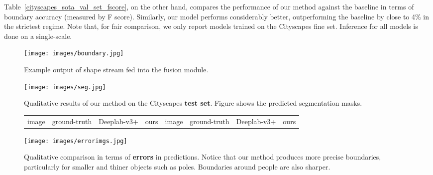 \documentclass[10pt,twocolumn,letterpaper]{article}
\begin{document}
Table~\ref{cityscapes_sota_val_set_fscore}, on the other hand, compares the performance of our method against the baseline in terms of boundary accuracy (measured by F score). 
Similarly, our model performs considerably better, outperforming the baseline by close to 4\% in the strictest regime. 
Note that, for fair comparison, we only report models trained on the Cityscapes fine set. Inference for all models is done on a single-scale.
  
  
  \begin{figure}[t!]
\vspace{-2mm}
\centering
\texttt{[image: images/boundary.jpg]}
\vspace{-7mm}
\caption{Example output of shape stream fed into the fusion module.
}
\label{fig:boundary}
\vspace{-2mm}
\end{figure}

\begin{figure*}[t!]
 
\centering
\texttt{[image: images/seg.jpg]} 
\vspace{-6.5mm}
\caption{Qualitative results of our method on the Cityscapes {\bf test set}. Figure shows the predicted segmentation masks.}
\label{fig:testset}
\end{figure*}

\begin{figure*}[t!]
  \vspace{-1mm}
 \centering
 \begin{footnotesize}
 \begin{tabular}{C{1.6cm}C{1.7cm}C{1.7cm}C{1.8cm}C{2cm}C{1.7cm}C{1.7cm}C{1.7cm}}
 image & ground-truth & Deeplab-v3+ & ours &  image & ground-truth & Deeplab-v3+ & ours\\[-1mm]
 \end{tabular}
  \end{footnotesize}
 \texttt{[image: images/errorimgs.jpg]} 
   \vspace{-8mm}
 \caption{Qualitative comparison in terms of {\bf errors} in predictions. Notice that our method produces more precise boundaries, particularly for smaller and thiner objects such as poles. Boundaries around people are also sharper.}
 \label{fig:errors_qualitative}
  \vspace{-1mm}
\end{figure*}
\end{document}
